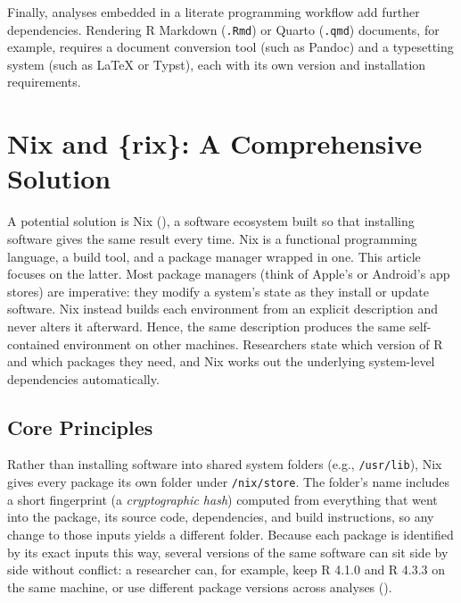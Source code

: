 \documentclass[
  man,
  longtable,
  nolmodern,
  notxfonts,
  notimes,
  colorlinks=true,linkcolor=blue,citecolor=blue,urlcolor=blue]{apa7}
\begin{document}
Finally, analyses embedded in a literate programming workflow add
further dependencies. Rendering R Markdown (\texttt{.Rmd}) or Quarto
(\texttt{.qmd}) documents, for example, requires a document conversion
tool (such as Pandoc) and a typesetting system (such as LaTeX or Typst),
each with its own version and installation requirements.

\section{Nix and \{rix\}: A Comprehensive
Solution}\label{nix-and-rix-a-comprehensive-solution}

A potential solution is Nix (), a software ecosystem built so that installing software
gives the same result every time. Nix is a functional programming
language, a build tool, and a package manager wrapped in one. This
article focuses on the latter. Most package managers (think of Apple's
or Android's app stores) are imperative: they modify a system's state as
they install or update software. Nix instead builds each environment
from an explicit description and never alters it afterward. Hence, the
same description produces the same self-contained environment on other
machines. Researchers state which version of R and which packages they
need, and Nix works out the underlying system-level dependencies
automatically.

\subsection{Core Principles}\label{core-principles}

Rather than installing software into shared system folders (e.g.,
\texttt{/usr/lib}), Nix gives every package its own folder under
\texttt{/nix/store}. The folder's name includes a short fingerprint (a
\emph{cryptographic hash}) computed from everything that went into the
package, its source code, dependencies, and build instructions, so any
change to those inputs yields a different folder. Because each package
is identified by its exact inputs this way, several versions of the same
software can sit side by side without conflict: a researcher can, for
example, keep R 4.1.0 and R 4.3.3 on the same machine, or use different
package versions across analyses
().
\end{document}
